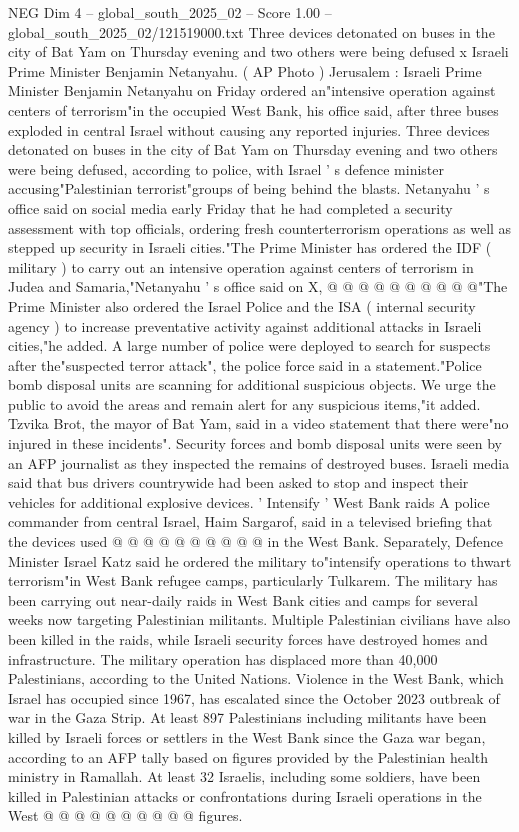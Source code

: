 \begin{textsample}{NEG Dim 4 – global\_south\_2025\_02 – Score 1.00 – global\_south\_2025\_02/121519000.txt}  \label{ex:f4_neg_432}
Three devices detonated on buses in the city of Bat Yam on Thursday evening and two others were being defused x Israeli Prime Minister Benjamin Netanyahu. ( AP Photo ) Jerusalem : Israeli Prime Minister Benjamin Netanyahu on Friday ordered an"intensive operation against centers of terrorism"in the occupied West Bank, his office said, after three buses exploded in central Israel without causing any reported injuries.
Three devices detonated on buses in the city of Bat Yam on Thursday evening and two others were being defused, according to police, with Israel ' s defence minister accusing"Palestinian terrorist"groups of being behind the blasts.
Netanyahu ' s office said on social media early Friday that he had completed a security assessment with top officials, ordering fresh counterterrorism operations as well as stepped up security in Israeli cities."The Prime Minister has ordered the IDF ( military ) to carry out an intensive operation against centers of terrorism in Judea and Samaria,"Netanyahu ' s office said on X, @ @ @ @ @ @ @ @ @ @"The Prime Minister also ordered the Israel Police and the ISA ( internal security agency ) to increase preventative activity against additional attacks in Israeli cities,"he added.
A large number of police were deployed to search for suspects after the"suspected terror attack", the police force said in a statement."Police bomb disposal units are scanning for additional suspicious objects.
We urge the public to avoid the areas and remain alert for any suspicious items,"it added.
Tzvika Brot, the mayor of Bat Yam, said in a video statement that there were"no injured in these incidents".
Security forces and bomb disposal units were seen by an AFP journalist as they inspected the remains of destroyed buses.
Israeli media said that bus drivers countrywide had been asked to stop and inspect their vehicles for additional explosive devices. ' Intensify ' West Bank raids A police commander from central Israel, Haim Sargarof, said in a televised briefing that the devices used @ @ @ @ @ @ @ @ @ @ in the West Bank.
Separately, Defence Minister Israel Katz said he ordered the military to"intensify operations to thwart terrorism"in West Bank refugee camps, particularly Tulkarem.
The military has been carrying out near-daily raids in West Bank cities and camps for several weeks now targeting Palestinian militants.
Multiple Palestinian civilians have also been killed in the raids, while Israeli security forces have destroyed homes and infrastructure.
The military operation has displaced more than 40,000 Palestinians, according to the United Nations.
Violence in the West Bank, which Israel has occupied since 1967, has escalated since the October 2023 outbreak of war in the Gaza Strip.
At least 897 Palestinians including militants have been killed by Israeli forces or settlers in the West Bank since the Gaza war began, according to an AFP tally based on figures provided by the Palestinian health ministry in Ramallah.
At least 32 Israelis, including some soldiers, have been killed in Palestinian attacks or confrontations during Israeli operations in the West @ @ @ @ @ @ @ @ @ @ figures.

\end{textsample}
